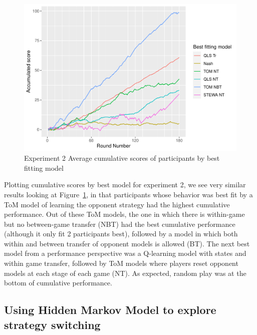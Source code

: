 \documentclass[man,floatsintext]{apa6}
\begin{document}
\begin{figure}

{\centering \includegraphics{draft_upgrade_v1_files/figure-latex/exp2-cumScores-1} 

}

\caption{Experiment 2 Average cumulative scores of participants by best fitting model}\label{fig:exp2-cumScores}
\end{figure}

Plotting cumulative scores by best model for experiment 2, we see very similar results looking at Figure~\ref{fig:exp2-cumScores}, in that participants whose behavior was best fit by a ToM model of learning the opponent strategy had the highest cumulative performance. Out of these ToM models, the one in which there is within-game but no between-game transfer (NBT) had the best cumulative performance (although it only fit 2 participants best), followed by a model in which both within and between transfer of opponent models is allowed (BT). The next best model from a performance perspective was a Q-learning model with states and within game transfer, followed by ToM models where players reset opponent models at each stage of each game (NT). As expected, random play was at the bottom of cumulative performance.

\hypertarget{using-hidden-markov-model-to-explore-strategy-switching}{%
\subsection{Using Hidden Markov Model to explore strategy switching}\label{using-hidden-markov-model-to-explore-strategy-switching}}
\end{document}
